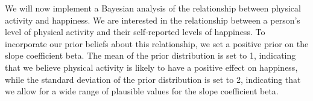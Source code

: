 \documentclass{article}
\begin{document}
We will now implement a Bayesian analysis of the relationship between
physical activity and happiness. We are interested in the relationship between a person's level of
physical activity and their self-reported levels of happiness. To
incorporate our prior beliefs about this relationship, we set a positive
prior on the slope coefficient beta. The mean of the prior distribution
is set to 1, indicating that we believe physical activity is likely to
have a positive effect on happiness, while the standard deviation of the
prior distribution is set to 2, indicating that we allow for a wide
range of plausible values for the slope coefficient beta.

\vspace{2em}

\begin{Shaded}
\begin{Highlighting}[]
\SpecialCharTok{::}\SpecialCharTok{$}\NormalTok{(}\NormalTok{, }\NormalTok{, }\NormalTok{,}\NormalTok{, }\NormalTok{, }\NormalTok{)}


\OtherTok{\textless{}{-}} 
\OtherTok{\textless{}{-}} \NormalTok{(}\SpecialCharTok{*} \NormalTok{, } 
\OtherTok{\textless{}{-}} 
\OtherTok{\textless{}{-}}  \NormalTok{, }
\OtherTok{\textless{}{-}}\SpecialCharTok{+}\SpecialCharTok{\%*\%}\SpecialCharTok{+}
  \NormalTok{(}\NormalTok{(}
\NormalTok{\}}


\end{Highlighting}
\end{Shaded}
\end{document}
